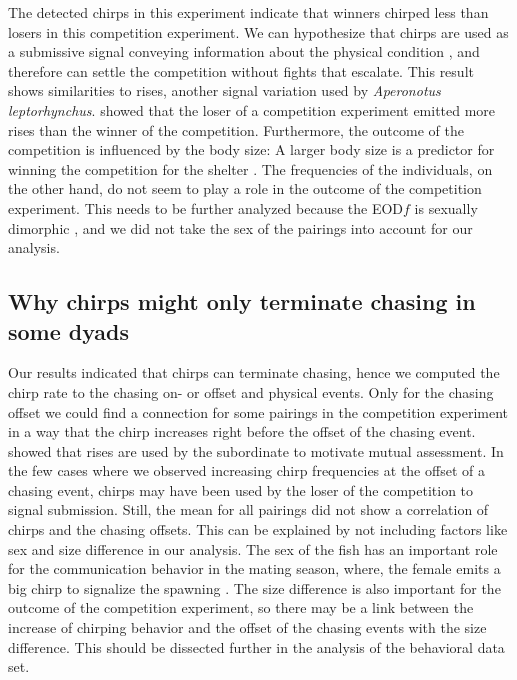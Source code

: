 The detected chirps in this experiment indicate that winners chirped less than losers in this competition experiment. We can hypothesize that chirps are used as a submissive signal conveying information about the physical condition \parencite{davies1978deep}, and therefore can settle the competition without fights that escalate. 
This result shows similarities to rises, another signal variation used by \textit{Aperonotus leptorhynchus}. \textcite{raabElectrocommunicationSignalsIndicate2021} showed that the loser of a competition experiment emitted more rises than the winner of the competition. Furthermore, the outcome of the competition is influenced by the body size: A larger body size is a predictor for winning the competition for the shelter \parencite{raabElectrocommunicationSignalsIndicate2021}. The frequencies of the individuals, on the other hand, do not seem to play a role in the outcome of the competition experiment. This needs to be further analyzed because the EOD$f$ is sexually dimorphic \parencite{meyer1987hormone}, and we did not take the sex of the pairings into account for our analysis.  

\subsection{Why chirps might only terminate chasing in some dyads}

Our results indicated that chirps can terminate chasing, hence we computed the chirp rate to the chasing on- or offset and physical events. Only for the chasing offset we could find a connection for some pairings in the competition experiment in a way that the chirp increases right before the offset of the chasing event. \textcite{raabElectrocommunicationSignalsIndicate2021} showed that rises are used by the subordinate to motivate mutual assessment. In the few cases where we observed increasing chirp frequencies at the offset of a chasing event, chirps may have been used by the loser of the competition to signal submission. Still, the mean for all pairings did not show a correlation of chirps and the chasing offsets. This can be explained by not including factors like sex and size difference in our analysis. The sex of the fish has an important role for the communication behavior in the mating season, where, the female emits a big chirp to signalize the spawning \parencite{hagedornCourtSparkElectric1985a, henningerStatisticsNaturalCommunication2018}. The size difference is also important for the outcome of the competition experiment, so there may be a link between the increase of chirping behavior and the offset of the chasing events with the size difference. This should be dissected further in the analysis of the behavioral data set. 


